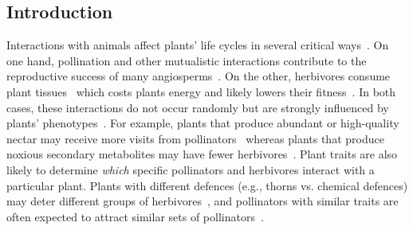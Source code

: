 \documentclass[12pt]{article}
\begin{document}
\begin{spacing}{1.5}
\clearpage

\section*{Introduction}

  Interactions with animals affect plants' life cycles in several critical
  ways~\citep{Mayr2001}. On one hand,
  pollination and other mutualistic interactions contribute
  to the reproductive success of many angiosperms~\citep{Ollerton2011}. 
  On the other, herbivores consume plant tissues~\citep{McCall2006} which
  costs plants energy and likely lowers their fitness~\citep{Strauss2002}.
  In both cases, these interactions do not occur randomly but
  are strongly influenced by plants' phenotypes~\citep{Fontaine2015}. 
  For example, plants that 
  produce abundant or high-quality nectar may receive more visits from
  pollinators~\citep{Robertson1999} whereas plants that produce noxious 
  secondary metabolites may have fewer herbivores~\citep{Johnson2014}. 
  Plant traits are also likely to determine \emph{which} specific pollinators 
  and herbivores interact with a particular plant. Plants with different defences 
  (e.g., thorns vs. chemical defences) may deter different groups of 
  herbivores~\citep{Ehrlich1964,Johnson2014}, and pollinators with similar traits are often expected to attract similar sets of pollinators~\citep{Waser1996,Fenster2004,Ollerton2009}.



\end{spacing}
\end{document}
